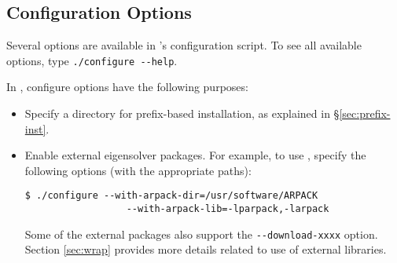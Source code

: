 \subsection{Configuration Options}
\label{sec:opt-inst}

Several options are available in \slepc's configuration script. To see all available options, type \Verb!./configure --help!.

In \slepc, configure options have the following purposes:
\begin{itemize}
\item Specify a directory for prefix-based installation, as explained in \S\ref{sec:prefix-inst}.
\item Enable external eigensolver packages. For example, to use \arpack, specify the following options (with the appropriate paths):
	\begin{Verbatim}[fontsize=\small]
	$ ./configure --with-arpack-dir=/usr/software/ARPACK
	              --with-arpack-lib=-lparpack,-larpack
	\end{Verbatim}
Some of the external packages also support the \Verb!--download-xxxx! option. Section \ref{sec:wrap} provides more details related to use of external libraries.
\end{itemize}

